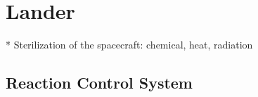 \chapter{Lander}

* Sterilization of the spacecraft: chemical, heat, radiation






\section{Reaction Control System}





